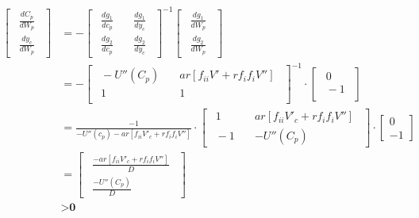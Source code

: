 \begin{align*}
\begin{bmatrix}
    \ \ \frac{dC_p}{dW_p}\ \ \\
    \ \ \frac{dy_c}{dW_p}\ \
\end{bmatrix} &= - \begin{bmatrix}
                    \ \ \frac{dg_1}{dc_p} \quad &\frac{dg_1}{dy_c}\ \ \\
                    \ \ \frac{dg_2}{dc_p} \quad &\frac{dg_2}{dy_c}\ \
                  \end{bmatrix}^{-1} \begin{bmatrix}
                                        \ \ \frac{dg_1}{dW_p}\ \ \\
                                        \ \ \frac{dg_2}{dW_p}\ \
                                     \end{bmatrix} \\
              &= - \begin{bmatrix}
                        \ \ -U''(C_p) \quad &a r [f_{ii} V' + r f_i f_i V'']\ \ \\
                        \ \ 1 \quad &1\ \ \\
                    \end{bmatrix}^{-1} \cdot \begin{bmatrix}
                                                \ \ 0 \ \ \\
                                                \ \ -1 \ \ \\
                                             \end{bmatrix} \\
              &= \frac{-1}{-U''(c_p) - a r [f_{ii} V'_c + r f_i f_i V'']} \cdot \begin{bmatrix}
                                                                                                    \ \ 1 \quad &a r [f_{ii} V'_c + r f_i f_i V'']\ \ \\
                                                                                                    \ \ -1 \quad &-U''(C_p)\ \
                                                                                                \end{bmatrix} \cdot \begin{bmatrix}
                                                                                                    0 \\
                                                                                                    -1
                                                                                                \end{bmatrix} \\
              &= \begin{bmatrix}
                    \ \ \frac{- a r [f_{ii} V'_c + r f_i f_i V'']}{D}\ \ \\
                    \ \ \frac{-U''(C_p)}{D}\ \
                 \end{bmatrix} \\ & > \textbf{0}
\end{align*}

